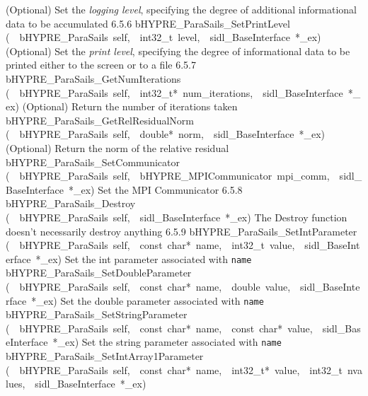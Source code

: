\documentclass{article}
\begin{document}
\begin{cxxentry}
\begin{cxxentry}
\begin{cxxnames}
        {
(Optional) Set the {\it logging level}, specifying the degree
of additional informational data to be accumulated}
        {6.5.6}
        {bHYPRE\_ParaSails\_SetPrintLevel}
        {(\ \ bHYPRE\_ParaSails\ self,\ \ int32\_t\ level,\ \ sidl\_BaseInterface\ *\_ex)}
        {
(Optional) Set the {\it print level}, specifying the degree
of informational data to be printed either to the screen or
to a file}
        {6.5.7}
        {bHYPRE\_ParaSails\_GetNumIterations}
        {(\ \ bHYPRE\_ParaSails\ self,\ \ int32\_t*\ num\_iterations,\ \ sidl\_BaseInterface\ *\_ex)}
        {
(Optional) Return the number of iterations taken}
        {}
\label{cxx.6.5.15}
        {bHYPRE\_ParaSails\_GetRelResidualNorm}
        {(\ \ bHYPRE\_ParaSails\ self,\ \ double*\ norm,\ \ sidl\_BaseInterface\ *\_ex)}
        {
(Optional) Return the norm of the relative residual}
        {}
\label{cxx.6.5.16}
        {bHYPRE\_ParaSails\_SetCommunicator}
        {(\ \ bHYPRE\_ParaSails\ self,\ \ bHYPRE\_MPICommunicator\ mpi\_comm,\ \ sidl\_BaseInterface\ *\_ex)}
        {
Set the MPI Communicator}
        {6.5.8}
        {bHYPRE\_ParaSails\_Destroy}
        {(\ \ bHYPRE\_ParaSails\ self,\ \ sidl\_BaseInterface\ *\_ex)}
        {
The Destroy function doesn't necessarily destroy anything}
        {6.5.9}
        {bHYPRE\_ParaSails\_SetIntParameter}
        {(\ \ bHYPRE\_ParaSails\ self,\ \ const\ char*\ name,\ \ int32\_t\ value,\ \ sidl\_BaseInterface\ *\_ex)}
        {
Set the int parameter associated with {\tt name}}
        {}
\label{cxx.6.5.17}
        {bHYPRE\_ParaSails\_SetDoubleParameter}
        {(\ \ bHYPRE\_ParaSails\ self,\ \ const\ char*\ name,\ \ double\ value,\ \ sidl\_BaseInterface\ *\_ex)}
        {
Set the double parameter associated with {\tt name}}
        {}
\label{cxx.6.5.18}
        {bHYPRE\_ParaSails\_SetStringParameter}
        {(\ \ bHYPRE\_ParaSails\ self,\ \ const\ char*\ name,\ \ const\ char*\ value,\ \ sidl\_BaseInterface\ *\_ex)}
        {
Set the string parameter associated with {\tt name}}
        {}
\label{cxx.6.5.19}
        {bHYPRE\_ParaSails\_SetIntArray1Parameter}
        {(\ \ bHYPRE\_ParaSails\ self,\ \ const\ char*\ name,\ \ int32\_t*\ value,\ \ int32\_t\ nvalues,\ \ sidl\_BaseInterface\ *\_ex)}

\end{cxxnames}
\end{cxxentry}
\end{cxxentry}
\end{document}

